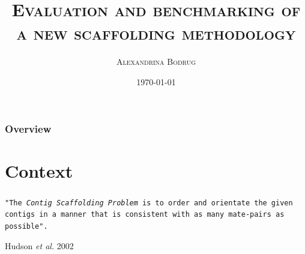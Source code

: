\documentclass{beamer}
\title[\textsc{Scaffolding benchmarking}]{\textsc{Evaluation and benchmarking of a new scaffolding methodology}} %
\author{\textsc{Alexandrina Bodrug}} %
\institute[\textsc{genscale, irisa}] %
{
\textit{\textsc{\tiny Supervisors: Pr. Rumen Andonov \& Dr. Dominique Lavenier}} \\
\vspace*{1cm}
\textsc{University Rennes 1} \\ %
\textit{\textsc{\tiny Bioinformatics and Genomics Master}} %
}
\date{\tiny \textsc{\today}} %
\begin{document}
\begin{frame}
\titlepage %
\end{frame}

\begin{frame}
\frametitle{Overview} %
\tableofcontents %
\end{frame}


\section{Context}\label{1}
\begin{frame}
\frametitle{\textsc{}}
\texttt{"The \textit{Contig Scaffolding Problem}  is to order and orientate the given contigs in a manner that is consistent with as many mate-pairs as possible".}
\begin{center}
Hudson \textit{et al.} 2002
\end{center}
\end{frame}
\end{document}
